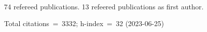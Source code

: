 74 refereed publications. 13 refeered publications as first author.

Total citations~=~3332; h-index~=~32 (2023-06-25)